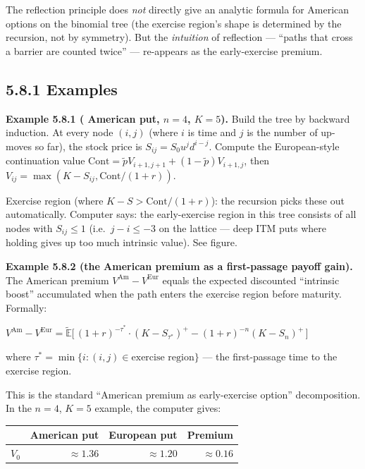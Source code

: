 \documentclass[
  10pt,
  twoside]{book}
\newcounter{none} %
\begin{document}
The reflection principle does \emph{not} directly give an analytic
formula for American options on the binomial tree (the exercise region's
shape is determined by the recursion, not by symmetry). But the
\emph{intuition} of reflection --- ``paths that cross a barrier are
counted twice'' --- re-appears as the early-exercise premium.

\subsection{5.8.1 Examples}\label{examples-28}

\textbf{Example 5.8.1 ( American put, \(n = 4\), \(K = 5\)).} Build the
tree by backward induction. At every node \((i, j)\) (where \(i\) is
time and \(j\) is the number of up-moves so far), the stock price is
\(S_{ij} = S_0 u^j d^{i-j}\). Compute the European-style continuation
value \(\text{Cont} = \tilde p V_{i+1,j+1} + (1-\tilde p) V_{i+1,j}\),
then \(V_{ij} = \max(K - S_{ij}, \text{Cont}/(1+r))\).

Exercise region (where \(K - S > \text{Cont}/(1+r)\)): the recursion
picks these out automatically. Computer says: the early-exercise region
in this tree consists of all nodes with \(S_{ij} \le 1\)
(i.e.~\(j - i \le -3\) on the lattice --- deep ITM puts where holding
gives up too much intrinsic value). See figure.

\textbf{Example 5.8.2 (the American premium as a first-passage payoff
gain).} The American premium \(V^{\text{Am}} - V^{\text{Eur}}\) equals
the expected discounted ``intrinsic boost'' accumulated when the path
enters the exercise region before maturity. Formally:

\(V^{\text{Am}} - V^{\text{Eur}} = \tilde{\mathbb E}\bigl[\, (1+r)^{-\tau^*} \cdot (K - S_{\tau^*})^+ - (1+r)^{-n} (K - S_n)^+ \,\bigr]\)

where \(\tau^* = \min\{i : (i, j) \in \text{exercise region}\}\) --- the
first-passage time to the exercise region.

This is the standard ``American premium as early-exercise option''
decomposition. In the \(n = 4\), \(K = 5\) example, the computer gives:

{\def\LTcaptype{none} %
\begin{table}[H]
\centering
\begin{tabular}{|l|r|r|r|}
\toprule
& American put & European put & Premium \\
\midrule



\(V_0\) & \(\approx 1.36\) & \(\approx 1.20\) & \(\approx 0.16\) \\
\bottomrule
\end{tabular}
\end{table}
}
\end{document}
